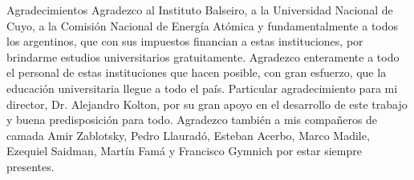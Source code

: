 \documentclass[12pt,screen,twoside]{ibtesis}
\begin{document}
\begin{postliminary}
\begin{seccion}{Agradecimientos}
Agradezco al Instituto Balseiro, a la Universidad Nacional de Cuyo, a la Comisión Nacional de Energía Atómica y fundamentalmente a todos los argentinos, que con sus impuestos financian a estas instituciones, por brindarme estudios universitarios gratuitamente. 
Agradezco enteramente a todo el personal de estas instituciones que hacen posible, con gran esfuerzo, que la educación universitaria llegue a todo el país. Particular agradecimiento para mi director, Dr. Alejandro Kolton, por su gran apoyo en el desarrollo de este trabajo y buena predisposición para todo. Agradezco también a mis compañeros de camada Amir Zablotsky, Pedro Llauradó, Esteban Acerbo, Marco Madile, Ezequiel Saidman, Martín Famá y Francisco Gymnich por estar siempre presentes.
\end{seccion}
\end{postliminary}
\end{document}
